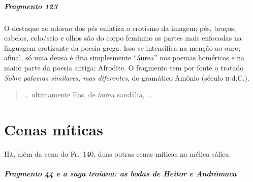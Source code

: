 \paragraph{Fragmento 123}

{\small O destaque ao adorno dos pés enfatiza o erotismo da imagem; pés, braços,
cabelos, colo/seio e olhos são do corpo feminino as partes mais enfocadas na
linguagem erotizante da poesia grega. Isso se intensifica na menção ao ouro;
afinal, só uma deusa é dita simplesmente ``áurea” nos poemas homéricos
e na maior parte da poesia antiga: Afrodite. O fragmento tem por fonte o
tratado \textit{Sobre palavras similares, mas diferentes}, do gramático Amônio
(século \textsc{ii} d.C.).}

\begin{verse}
\ldots{} ultimamente Eos, de áurea sandália, \ldots{}
\end{verse}


\chapter{Cenas míticas}

\textsc{Há,} além da cena do Fr.~140, duas outras cenas míticas na mélica sáfica.

\paragraph{Fragmento 44 e a saga troiana: as bodas de Heitor e Andrômaca}

